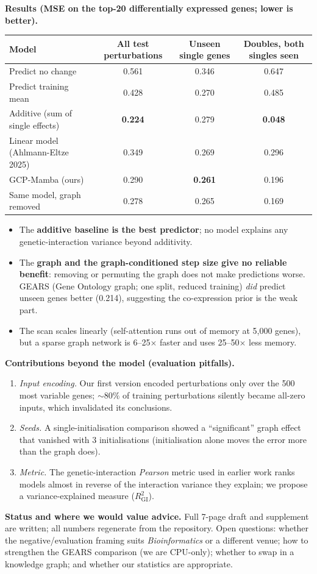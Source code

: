 \documentclass[10pt]{article}
\begin{document}
\textbf{Results (MSE on the top-20 differentially expressed genes; lower is better).}\\[-4pt]
\begin{center}\small
\begin{tabular}{lccc}
\toprule
Model & All test perturbations & Unseen single genes & Doubles, both singles seen\\
\midrule
Predict no change & 0.561 & 0.346 & 0.647\\
Predict training mean & 0.428 & 0.270 & 0.485\\
Additive (sum of single effects) & \textbf{0.224} & 0.279 & \textbf{0.048}\\
Linear model (Ahlmann-Eltze 2025) & 0.349 & 0.269 & 0.296\\
GCP-Mamba (ours) & 0.290 & \textbf{0.261} & 0.196\\
Same model, graph removed & 0.278 & 0.265 & 0.169\\
\bottomrule
\end{tabular}
\end{center}
\vspace{-4pt}
\begin{itemize}
\item The \textbf{additive baseline is the best predictor}; no model explains any genetic-interaction
variance beyond additivity.
\item The \textbf{graph and the graph-conditioned step size give no reliable benefit}: removing or
permuting the graph does not make predictions worse. GEARS (Gene Ontology graph; one split, reduced
training) \emph{did} predict unseen genes better (0.214), suggesting the co-expression prior is the weak part.
\item The scan scales linearly (self-attention runs out of memory at 5,000 genes), but a sparse graph
network is 6--25$\times$ faster and uses 25--50$\times$ less memory.
\end{itemize}

\textbf{Contributions beyond the model (evaluation pitfalls).}
\begin{enumerate}
\item \emph{Input encoding.} Our first version encoded perturbations only over the 500 most variable genes;
${\sim}80\%$ of training perturbations silently became all-zero inputs, which invalidated its conclusions.
\item \emph{Seeds.} A single-initialisation comparison showed a ``significant'' graph effect that vanished
with 3 initialisations (initialisation alone moves the error more than the graph does).
\item \emph{Metric.} The genetic-interaction \emph{Pearson} metric used in earlier work ranks models almost in
reverse of the interaction variance they explain; we propose a variance-explained measure ($R^2_{\mathrm{GI}}$).
\end{enumerate}

\textbf{Status and where we would value advice.} Full 7-page draft and supplement are written; all numbers
regenerate from the repository. Open questions: whether the negative/evaluation framing suits
\emph{Bioinformatics} or a different venue; how to strengthen the GEARS comparison (we are CPU-only); whether
to swap in a knowledge graph; and whether our statistics are appropriate.
\end{document}
